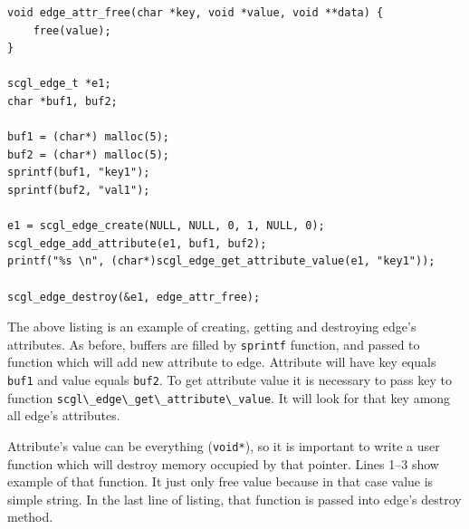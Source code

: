\documentclass[a4paper,12pt,polish,twoside,openright]{thesis}
\newcommand\code[1]{\lstinline[style=line]{#1}}
\begin{document}
\begin{lstlisting}[style=code,caption={Managing edge's attributes}]
void edge_attr_free(char *key, void *value, void **data) {
	free(value);
}

scgl_edge_t *e1;
char *buf1, buf2;

buf1 = (char*) malloc(5);
buf2 = (char*) malloc(5);
sprintf(buf1, "key1");
sprintf(buf2, "val1");

e1 = scgl_edge_create(NULL, NULL, 0, 1, NULL, 0);
scgl_edge_add_attribute(e1, buf1, buf2);
printf("%s \n", (char*)scgl_edge_get_attribute_value(e1, "key1"));

scgl_edge_destroy(&e1, edge_attr_free);
\end{lstlisting}
The above listing is an example of creating, getting and destroying edge's attributes.
As before, buffers are filled by \code{sprintf} function, and passed to function which will add new attribute to edge.
Attribute will have key equals \code{buf1} and value equals \code{buf2}.
To get attribute value it is necessary to pass key to function \code{scgl\_edge\_get\_attribute\_value}. It will look for that key among all edge's attributes.

Attribute's value can be everything (\code{void*}), so it is important to write a user function which will destroy memory occupied by that pointer.
Lines 1--3 show example of that function.
It just only free value because in that case value is simple string.
In the last line of listing, that function is passed into edge's destroy method.
\end{document}
